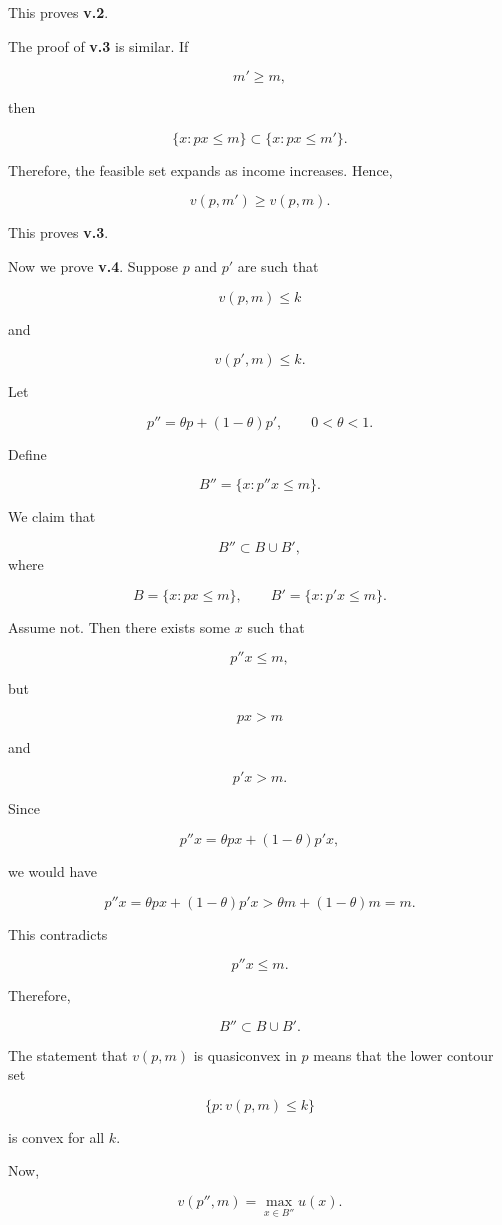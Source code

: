 This proves \textbf{v.2}.

\medskip

The proof of \textbf{v.3} is similar. If

\[
m'\ge m,
\]

then

\[
\{x:px\le m\}
\subset
\{x:px\le m'\}.
\]

Therefore, the feasible set expands as income increases. Hence,

\[
v(p,m')\ge v(p,m).
\]

This proves \textbf{v.3}.

\medskip

Now we prove \textbf{v.4}. Suppose \(p\) and \(p'\) are such that

\[
v(p,m)\le k
\]

and

\[
v(p',m)\le k.
\]

Let

\[
p''=\theta p+(1-\theta)p',
\qquad
0<\theta<1.
\]

Define

\[
B''=\{x:p''x\le m\}.
\]

We claim that

\[
B''\subset B\cup B',
\]
where

\[
B=\{x:px\le m\},
\qquad
B'=\{x:p'x\le m\}.
\]

Assume not. Then there exists some \(x\) such that

\[
p''x\le m,
\]

but

\[
px>m
\]

and

\[
p'x>m.
\]

Since

\[
p''x
=
\theta px+(1-\theta)p'x,
\]

we would have

\[
p''x
=
\theta px+(1-\theta)p'x
>
\theta m+(1-\theta)m
=
m.
\]

This contradicts

\[
p''x\le m.
\]

Therefore,

\[
B''\subset B\cup B'.
\]

The statement that \(v(p,m)\) is quasiconvex in \(p\) means that the lower contour set

\[
\{p:v(p,m)\le k\}
\]

is convex for all \(k\).

Now,

\[
v(p'',m)
=
\max_{x\in B''}u(x).
\]

